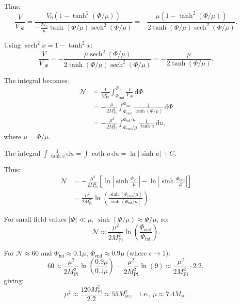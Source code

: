 \documentclass[11pt,a4paper]{article}
\numberwithin{equation}{section}
\theoremstyle{plain}
\theoremstyle{definition}
\theoremstyle{remark}
\newcommand{\dd}{\mathrm{d}}
\begin{document}
Thus:
\begin{equation}
\frac{V}{V_{,\Phi}} = \frac{V_0(1-\tanh^2(\Phi/\mu))}{-\frac{2V_0}{\mu}\tanh(\Phi/\mu)\operatorname{sech}^2(\Phi/\mu)} = -\frac{\mu(1-\tanh^2(\Phi/\mu))}{2\tanh(\Phi/\mu)\operatorname{sech}^2(\Phi/\mu)}.
\end{equation}

Using $\operatorname{sech}^2 x = 1 - \tanh^2 x$:
\begin{equation}
\frac{V}{V_{,\Phi}} = -\frac{\mu\operatorname{sech}^2(\Phi/\mu)}{2\tanh(\Phi/\mu)\operatorname{sech}^2(\Phi/\mu)} = -\frac{\mu}{2\tanh(\Phi/\mu)}.
\end{equation}

The integral becomes:
\begin{align}
\mathcal{N} &= \frac{1}{M_{\mathrm{Pl}}^2}\int_{\Phi_{\mathrm{end}}}^{\Phi_{\mathrm{ini}}} \frac{V}{V_{,\Phi}}\,\dd\Phi\\
&= -\frac{\mu}{2M_{\mathrm{Pl}}^2}\int_{\Phi_{\mathrm{end}}}^{\Phi_{\mathrm{ini}}} \frac{1}{\tanh(\Phi/\mu)}\,\dd\Phi\\
&= -\frac{\mu^2}{2M_{\mathrm{Pl}}^2}\int_{\Phi_{\mathrm{end}}/\mu}^{\Phi_{\mathrm{ini}}/\mu} \frac{1}{\tanh u}\,\dd u,
\end{align}
where $u = \Phi/\mu$.

The integral $\int \frac{1}{\tanh u}\,\dd u = \int \coth u\,\dd u = \ln|\sinh u| + C$.

Thus:
\begin{align}
\mathcal{N} &= -\frac{\mu^2}{2M_{\mathrm{Pl}}^2}\left[\ln\left|\sinh\frac{\Phi_{\mathrm{ini}}}{\mu}\right| - \ln\left|\sinh\frac{\Phi_{\mathrm{end}}}{\mu}\right|\right]\\
&= \frac{\mu^2}{2M_{\mathrm{Pl}}^2}\ln\left(\frac{\sinh(\Phi_{\mathrm{end}}/\mu)}{\sinh(\Phi_{\mathrm{ini}}/\mu)}\right).
\label{eq:efolds-tanh-exact}
\end{align}

For small field values $|\Phi| \ll \mu$, $\sinh(\Phi/\mu) \approx \Phi/\mu$, so:
\begin{equation}
\mathcal{N} \approx \frac{\mu^2}{2M_{\mathrm{Pl}}^2}\ln\left(\frac{\Phi_{\mathrm{end}}}{\Phi_{\mathrm{ini}}}\right).
\label{eq:efolds-tanh-approx}
\end{equation}

For $\mathcal{N} \approx 60$ and $\Phi_{\mathrm{ini}} \approx 0.1\mu$, $\Phi_{\mathrm{end}} \approx 0.9\mu$ (where $\epsilon \to 1$):
\begin{equation}
60 \approx \frac{\mu^2}{2M_{\mathrm{Pl}}^2}\ln\left(\frac{0.9\mu}{0.1\mu}\right) = \frac{\mu^2}{2M_{\mathrm{Pl}}^2}\ln(9) \approx \frac{\mu^2}{2M_{\mathrm{Pl}}^2}\cdot 2.2,
\end{equation}
giving:
\begin{equation}
\mu^2 \approx \frac{120M_{\mathrm{Pl}}^2}{2.2} \approx 55M_{\mathrm{Pl}}^2,\quad\text{i.e., }\mu \approx 7.4M_{\mathrm{Pl}}.
\end{equation}
\end{document}
